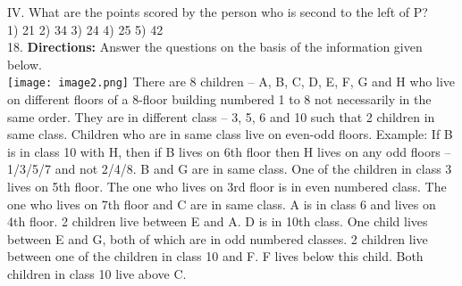 \documentclass[
]{article}
\begin{document}
IV. What are the points scored by the person who is second to the left of P?\\
1) 21 \hspace{2mm}2) 34 \hspace{2mm}3) 24 \hspace{2mm}4) 25 \hspace{2mm}5) 42\\

18. \textbf{Directions:} Answer the questions on the basis of the information given below.\\
\texttt{[image: image2.png]}
There are 8 children – A, B, C, D, E, F, G and H who live on different floors of a 8-floor
building numbered 1 to 8 not necessarily in the same order. They are in different class – 3, 5,
6 and 10 such that 2 children in same class. Children who are in same class live on even-odd
floors. Example: If B is in class 10 with H, then if B lives on 6th floor then H lives on any odd
floors – 1/3/5/7 and not 2/4/8.
B and G are in same class. One of the children in class 3 lives on 5th floor. The one who lives
on 3rd floor is in even numbered class. The one who lives on 7th floor and C are in same
class. A is in class 6 and lives on 4th floor. 2 children live between E and A. D is in 10th class.
One child lives between E and G, both of which are in odd numbered classes. 2 children live
between one of the children in class 10 and F. F lives below this child. Both children in class
10 live above C.\\
\end{document}
